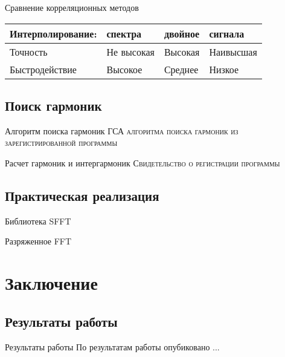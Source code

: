 \begin{frame}{Сравнение корреляционных методов}
	\begin{tabular}{llll}
		\toprule Интерполирование: &
		спектра & 
		двойное &
		сигнала\\ 
		\midrule
		Точность &
		Не высокая & 
		Высокая &
		Наивысшая\\ 
		\midrule
		Быстродействие &
		Высокое & 
		Среднее &
		Низкое \\ 
		\midrule		
	\end{tabular}
\end{frame}

\subsection{Поиск гармоник}
\begin{frame}{Алгоритм поиска гармоник}
	\textsc{ГСА алгоритма поиска гармоник из зарегистрированной программы}
\end{frame}

\begin{frame}{Расчет гармоник и интергармоник}
	\textsc{Свидетельство о регистрации программы}
\end{frame}

\subsection{Практическая реализация}
\begin{frame}{Библиотека SFFT}
	
\end{frame}

\begin{frame}{Разряженное FFT}
	
\end{frame}

\section{Заключение}

\subsection{Результаты работы}
\begin{frame}{Результаты работы}
	По результатам работы опубиковано ...
\end{frame}

